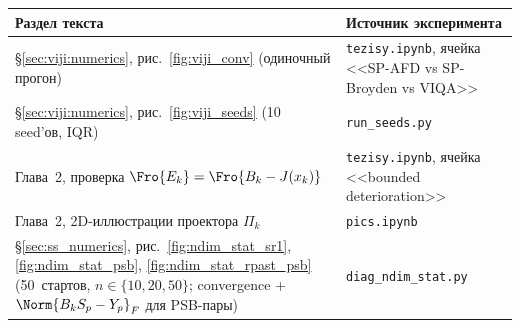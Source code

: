 \begin{center}
\begin{tabularx}{\textwidth}{@{}XX@{}}
\toprule
Раздел текста & Источник эксперимента \\
\midrule
\S\ref{sec:viji:numerics}, рис.~\ref{fig:viji_conv} (одиночный прогон) & \texttt{tezisy.ipynb}, ячейка <<SP-AFD vs SP-Broyden vs VIQA>> \\
\S\ref{sec:viji:numerics}, рис.~\ref{fig:viji_seeds} (10 seed'ов, IQR) & \texttt{run\_seeds.py} \\
Глава~2, проверка $\Fro{E_k}=\Fro{B_k - J(x_k)}$ & \texttt{tezisy.ipynb}, ячейка <<bounded deterioration>> \\
Глава~2, 2D-иллюстрации проектора $\Pi_k$ & \texttt{pics.ipynb} \\
\S\ref{sec:ss_numerics}, рис.~\ref{fig:ndim_stat_sr1}, \ref{fig:ndim_stat_psb}, \ref{fig:ndim_stat_rpast_psb} (50~стартов, $n\in\{10,20,50\}$; convergence + $\Norm{B_k S_p - Y_p}_F$ для PSB-пары) & \texttt{diag\_ndim\_stat.py} \\
\bottomrule
\end{tabularx}
\end{center}
